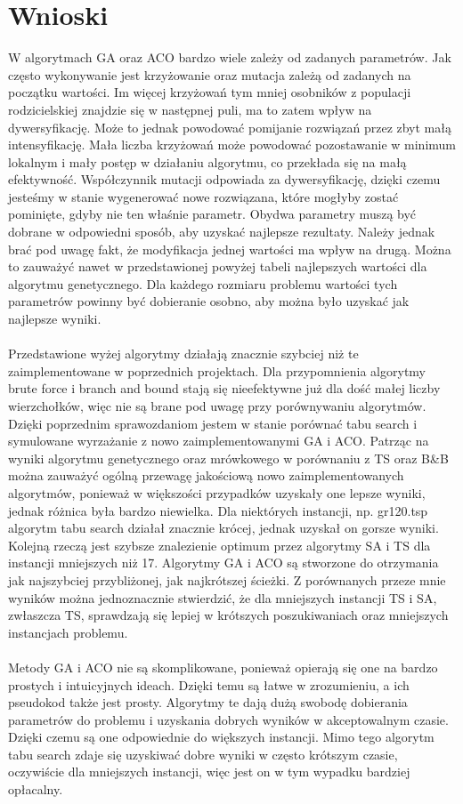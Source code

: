 \documentclass[12pt,a4paper,titlepage]{article}
\begin{document}
\section{Wnioski}
W algorytmach GA oraz ACO bardzo wiele zależy od zadanych parametrów. Jak często wykonywanie jest krzyżowanie oraz mutacja zależą od zadanych na początku wartości. Im więcej krzyżowań tym mniej osobników z populacji rodzicielskiej znajdzie się w następnej puli, ma to zatem wpływ na dywersyfikację. Może to jednak powodować pomijanie rozwiązań przez zbyt małą intensyfikację. Mała liczba krzyżowań może powodować pozostawanie w minimum lokalnym i mały postęp w działaniu algorytmu, co przekłada się na małą efektywność. Współczynnik mutacji odpowiada za dywersyfikację, dzięki czemu jesteśmy w stanie wygenerować nowe rozwiązana, które mogłyby zostać pominięte, gdyby nie ten właśnie parametr. Obydwa parametry muszą być dobrane w odpowiedni sposób, aby uzyskać najlepsze rezultaty. Należy jednak brać pod uwagę fakt, że modyfikacja jednej wartości ma wpływ na drugą. Można to zauważyć nawet w przedstawionej powyżej tabeli najlepszych wartości dla algorytmu genetycznego. Dla każdego rozmiaru problemu wartości tych parametrów powinny być dobieranie osobno, aby można było uzyskać jak najlepsze wyniki.
\\\\
Przedstawione wyżej algorytmy działają znacznie szybciej niż te zaimplementowane w poprzednich projektach. Dla przypomnienia algorytmy brute force i branch and bound stają się nieefektywne już dla dość małej liczby wierzchołków, więc nie są brane pod uwagę przy porównywaniu algorytmów. Dzięki poprzednim sprawozdaniom jestem w stanie porównać tabu search i symulowane wyrzażanie z nowo zaimplementowanymi GA i ACO. Patrząc na wyniki algorytmu genetycznego oraz mrówkowego w porównaniu z TS oraz B\&B można zauważyć ogólną przewagę jakościową nowo zaimplementowanych algorytmów, ponieważ w większości przypadków uzyskały one lepsze wyniki, jednak różnica była bardzo niewielka. Dla niektórych instancji, np. gr120.tsp algorytm tabu search działał znacznie krócej, jednak uzyskał on gorsze wyniki. Kolejną rzeczą jest szybsze znalezienie optimum przez algorytmy SA i TS dla instancji mniejszych niż 17. Algorytmy GA i ACO są stworzone do otrzymania jak najszybciej przybliżonej, jak najkrótszej ścieżki. Z porównanych przeze mnie wyników można jednoznacznie stwierdzić, że dla mniejszych instancji TS i SA, zwłaszcza TS, sprawdzają się lepiej w krótszych poszukiwaniach oraz mniejszych instancjach problemu.
\\\\
Metody GA i ACO nie są skomplikowane, ponieważ opierają się one na bardzo prostych i intuicyjnych ideach. Dzięki temu są łatwe w zrozumieniu, a ich pseudokod także jest prosty. Algorytmy te dają dużą swobodę dobierania parametrów do problemu i uzyskania dobrych wyników w akceptowalnym czasie. Dzięki czemu są one odpowiednie do większych instancji. Mimo tego algorytm tabu search zdaje się uzyskiwać dobre wyniki w często krótszym czasie, oczywiście dla mniejszych instancji, więc jest on w tym wypadku bardziej opłacalny.


\end{document}
